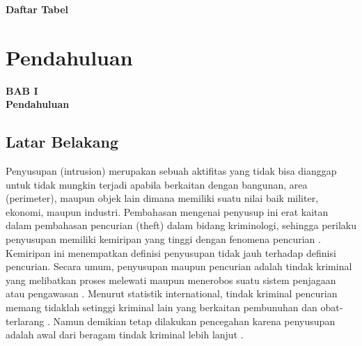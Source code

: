 \documentclass[12pt]{article}
\begin{document}
\newpage
\thispagestyle{plain}
\mbox{}


\newpage

	\begin{center}
		\textbf{{\large Daftar Tabel}}
	\end{center}


\newpage
\thispagestyle{plain}
\mbox{}


\newpage

	\setcounter{page}{9}

	\setcounter{section}{0}
	
	\setcounter{figure}{0}
	
	\section{Pendahuluan}
	
	\begin{center}
		{\large \textbf{BAB I}} \\
		{\large \textbf{Pendahuluan}}
	\end{center}
	
	\subsection{Latar Belakang}
	
	Penyusupan (intrusion) merupakan sebuah aktifitas yang tidak bisa dianggap untuk tidak mungkin terjadi apabila berkaitan dengan bangunan, area (perimeter), maupun objek lain dimana memiliki suatu nilai baik militer, ekonomi, maupun industri\cite{Assets}.
	Pembahasan mengenai penyusup ini erat kaitan dalam pembahasan pencurian (theft) dalam bidang kriminologi, sehingga perilaku penyusupan memiliki kemiripan yang tinggi dengan fenomena pencurian \cite{Felson1998}.
	Kemiripan ini menempatkan definisi penyusupan tidak jauh terhadap definisi pencurian. Secara umum, penyusupan maupun pencurian adalah tindak kriminal yang melibatkan proses melewati maupun menerobos suatu sistem penjagaan atau pengawasan \cite{Chapman}.
	Menurut statistik international, tindak kriminal pencurian memang tidaklah setinggi kriminal lain yang berkaitan pembunuhan dan obat-terlarang \cite{Frate2010}.
	Namun demikian tetap dilakukan pencegahan karena penyusupan adalah awal dari beragam tindak kriminal lebih lanjut \cite{Nesbit}.
	
\end{document}
